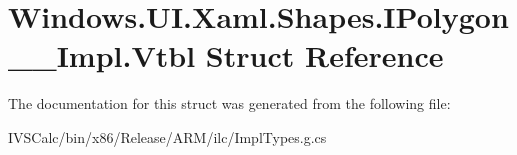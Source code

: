\hypertarget{struct_windows_1_1_u_i_1_1_xaml_1_1_shapes_1_1_i_polygon_____impl_1_1_vtbl}{}\section{Windows.\+U\+I.\+Xaml.\+Shapes.\+I\+Polygon\+\_\+\+\_\+\+Impl.\+Vtbl Struct Reference}
\label{struct_windows_1_1_u_i_1_1_xaml_1_1_shapes_1_1_i_polygon_____impl_1_1_vtbl}


The documentation for this struct was generated from the following file\+:\begin{DoxyCompactItemize}
\item 
I\+V\+S\+Calc/bin/x86/\+Release/\+A\+R\+M/ilc/Impl\+Types.\+g.\+cs\end{DoxyCompactItemize}
